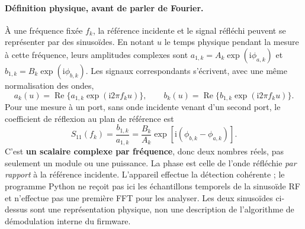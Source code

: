 \documentclass[11pt,a4paper]{article}
\newcommand{\ii}{\mathrm{i}}
\newcommand{\Reel}{\operatorname{Re}}
\begin{document}
\paragraph{Définition physique, avant de parler de Fourier.}
À une fréquence fixée $f_k$, la référence incidente et le signal réfléchi
peuvent se représenter par des sinusoïdes. En notant $u$ le temps physique
pendant la mesure à cette fréquence, leurs amplitudes complexes sont
$a_{1,k}=A_k\exp(\ii\phi_{a,k})$ et
$b_{1,k}=B_k\exp(\ii\phi_{b,k})$. Les signaux correspondants s'écrivent,
avec une même normalisation des ondes,
\begin{equation}
 a_k(u)=\Reel\{a_{1,k}\exp(\ii2\pi f_ku)\},\qquad
 b_k(u)=\Reel\{b_{1,k}\exp(\ii2\pi f_ku)\}.
\end{equation}
Pour une mesure à un port, sans onde incidente venant d'un second port,
le coefficient de réflexion au plan de référence est
\begin{equation}\label{eq:s11-definition}
 \boxed{S_{11}(f_k)=\frac{b_{1,k}}{a_{1,k}}
 =\frac{B_k}{A_k}\exp[\ii(\phi_{b,k}-\phi_{a,k})].}
\end{equation}
C'est \textbf{un scalaire complexe par fréquence}, donc deux nombres réels,
pas seulement un module ou une puissance. La phase est celle de l'onde
réfléchie \emph{par rapport} à la référence incidente. L'appareil effectue
la détection cohérente ; le programme Python ne reçoit pas ici les échantillons
temporels de la sinusoïde RF et n'effectue pas une première FFT pour les analyser.
Les deux sinusoïdes ci-dessus sont une représentation physique, non une
description de l'algorithme de démodulation interne du firmware.
\end{document}
